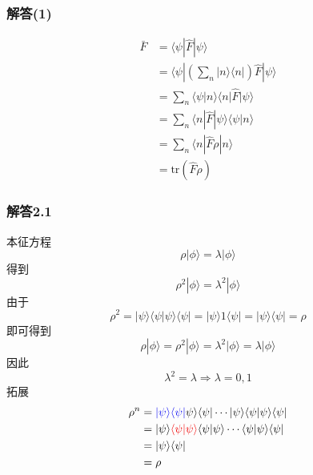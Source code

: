 \subsubsection{解答(1)}
\begin{equation}
    \begin{aligned}
        \bar{F}&=\langle \psi |\hat{F}|\psi \rangle 
\\
&=\langle \psi |\left( \sum_n{|n\rangle \langle n|} \right) \hat{F}|\psi \rangle 
\\
&=\sum_n{\langle \psi |n\rangle \langle n|\hat{F}|\psi \rangle}
\\
&=\sum_n{\langle n|\hat{F}|\psi \rangle \langle \psi |n\rangle}
\\
&=\sum_n{\langle n|\hat{F}\rho |n\rangle}
\\
&=\mathrm{tr}\left( \hat{F}\rho \right) 
    \end{aligned}
\end{equation}


\subsubsection{解答2.1}
本征方程
\begin{equation}
    \rho |\phi \rangle =\lambda |\phi \rangle 
\end{equation}
得到
\begin{equation}
    \rho ^2|\phi \rangle =\lambda ^2|\phi \rangle 
\end{equation}
由于
\begin{equation}
    \rho ^2=|\psi \rangle \langle \psi |\psi \rangle \langle \psi |=|\psi \rangle 1\langle \psi |=|\psi \rangle \langle \psi |=\rho 
\end{equation}
即可得到
\begin{equation}
    \rho |\phi \rangle =\rho ^2|\phi \rangle =\lambda ^2|\phi \rangle =\lambda |\phi \rangle 
\end{equation}
因此
\begin{equation}
    \lambda ^2=\lambda \Rightarrow \lambda =0,1
\end{equation}
拓展
\begin{equation}
    \begin{aligned}
        \rho ^n &={\color[RGB]{0, 0, 240} |\psi \rangle \langle \psi |}\psi \rangle \langle \psi |\cdots |\psi \rangle \langle \psi |\psi \rangle \langle \psi |
\\
&=|\psi \rangle {\color[RGB]{240, 0, 0} \langle \psi |\psi \rangle }\langle \psi |\psi \rangle \cdots \langle \psi |\psi \rangle \langle \psi |
\\
&=|\psi \rangle \langle \psi |
\\
&=\rho 
    \end{aligned}
\end{equation}


